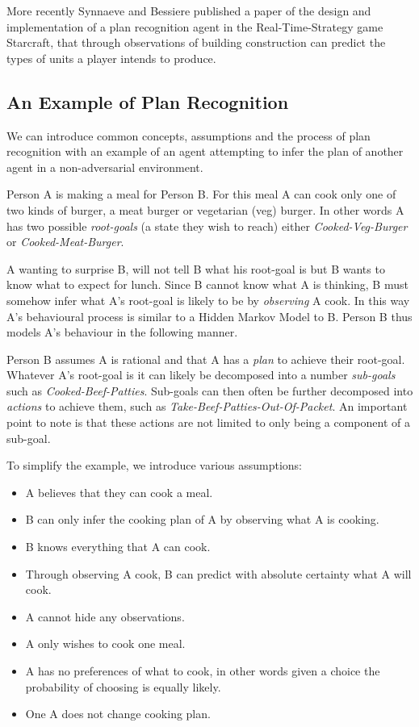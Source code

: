 \documentclass[parskip]{cs4rep}
\begin{document}
More recently Synnaeve and Bessiere \cite{conf/aiide/SynnaeveB11} published a paper of the design and implementation of a plan recognition agent in the Real-Time-Strategy game Starcraft, that through observations of building construction can predict the types of units a player intends to produce.

\subsection{An Example of Plan Recognition}

We can introduce common concepts, assumptions and the process of plan recognition with an example of an agent attempting to infer the plan of another agent in a non-adversarial environment. 

Person A is making a meal for Person B. For this meal A can cook only one of two kinds of burger, a meat burger or vegetarian (veg) burger. In other words A has two possible \textit{root-goals} (a state they wish to reach) either \textit{Cooked-Veg-Burger} or \textit{Cooked-Meat-Burger}. 

A wanting to surprise B, will not tell B what his root-goal is but B wants to know what to expect for lunch. Since B cannot know what A is thinking, B must somehow infer what A's root-goal is likely to be by \textit{observing} A cook. In this way A's behavioural process is similar to a Hidden Markov Model to B. Person B thus models A's behaviour in the following manner. 

Person B assumes A is rational and that A has a \textit{plan} to achieve their root-goal. Whatever A's root-goal is it can likely be decomposed into a number \textit{sub-goals} such as \textit{Cooked-Beef-Patties}. Sub-goals can then often be further decomposed into \textit{actions} to achieve them, such as \textit{Take-Beef-Patties-Out-Of-Packet}. An important point to note is that these actions are not limited to only being a component of a sub-goal.

To simplify the example, we introduce various assumptions:

\begin{itemize}
\item
A believes that they can cook a meal.
\item
B can only infer the cooking plan of A by observing what A is cooking.
\item
B knows everything that A can cook.
\item
Through observing A cook, B can predict with absolute certainty what A will cook.
\item
A cannot hide any observations.
\item
A only wishes to cook one meal.
\item
A has no preferences of what to cook, in other words given a choice the probability of choosing is equally likely.
\item
One A does not change cooking plan.
\end{itemize}
\end{document}
